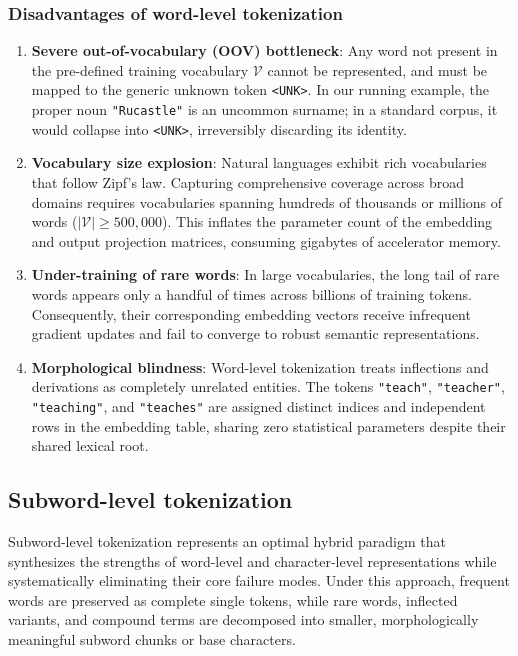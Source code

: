 \documentclass[../../main.tex]{subfiles}
\begin{document}
\subsubsection{Disadvantages of word-level tokenization}
\begin{enumerate}
    \item \textbf{Severe out-of-vocabulary (OOV) bottleneck}: Any word not present in the pre-defined training vocabulary $\mathcal{V}$ cannot be represented, and must be mapped to the generic unknown token \texttt{<UNK>}. In our running example, the proper noun \texttt{"Rucastle"} is an uncommon surname; in a standard corpus, it would collapse into \texttt{<UNK>}, irreversibly discarding its identity.
    \item \textbf{Vocabulary size explosion}: Natural languages exhibit rich vocabularies that follow Zipf's law. Capturing comprehensive coverage across broad domains requires vocabularies spanning hundreds of thousands or millions of words ($|\mathcal{V}| \ge 500{,}000$). This inflates the parameter count of the embedding and output projection matrices, consuming gigabytes of accelerator memory.
    \item \textbf{Under-training of rare words}: In large vocabularies, the long tail of rare words appears only a handful of times across billions of training tokens. Consequently, their corresponding embedding vectors receive infrequent gradient updates and fail to converge to robust semantic representations.
    \item \textbf{Morphological blindness}: Word-level tokenization treats inflections and derivations as completely unrelated entities. The tokens \texttt{"teach"}, \texttt{"teacher"}, \texttt{"teaching"}, and \texttt{"teaches"} are assigned distinct indices and independent rows in the embedding table, sharing zero statistical parameters despite their shared lexical root.
\end{enumerate}

\subsection{Subword-level tokenization}
\label{subsec:subword_level_tokenization}

Subword-level tokenization represents an optimal hybrid paradigm that synthesizes the strengths of word-level and character-level representations while systematically eliminating their core failure modes. Under this approach, frequent words are preserved as complete single tokens, while rare words, inflected variants, and compound terms are decomposed into smaller, morphologically meaningful subword chunks or base characters.
\end{document}
